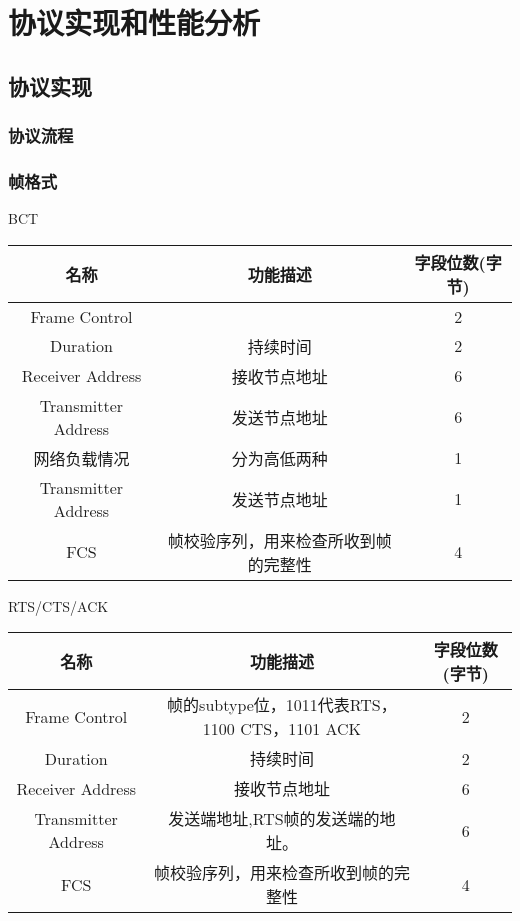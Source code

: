 \chapter{协议实现和性能分析}
\section {协议实现}
\subsection{协议流程}

\subsection{帧格式}
BCT\\
\begin{tabular}{|c|c|c|}%
	\hline  %
	名称&功能描述&字段位数(字节)\\
	\hline  %
	Frame Control& &2\\
	\hline %
	Duration&持续时间&2\\
	\hline
	Receiver Address&接收节点地址&6\\
	\hline
	Transmitter Address&发送节点地址&6\\
	\hline
	网络负载情况&分为高低两种&1\\
	\hline
	Transmitter Address&发送节点地址&1\\
	\hline
	FCS&帧校验序列，用来检查所收到帧的完整性&4\\
	\hline
\end{tabular}

RTS/CTS/ACK\\
\begin{tabular}{|c|c|c|}%
	\hline  %
	名称&功能描述&字段位数(字节)\\
	\hline  %
	Frame Control&帧的subtype位，1011代表RTS，1100 CTS，1101 ACK&2\\
	\hline %
	Duration&持续时间&2\\
	\hline
	Receiver Address&接收节点地址&6\\
	\hline
	Transmitter Address&发送端地址,RTS帧的发送端的地址。&6\\
	\hline
	FCS&帧校验序列，用来检查所收到帧的完整性&4\\
	\hline
\end{tabular}

